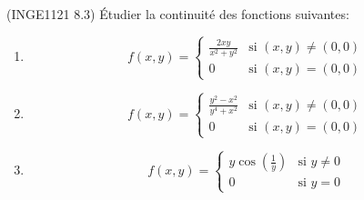 

\begin{exercice}\label{exoFoncDeuxVar0012}

	(INGE1121 8.3) Étudier la continuité des fonctions suivantes:
	\begin{enumerate}

		\item
			\begin{equation}
				f(x,y)=\begin{cases}
					\frac{ 2xy }{ x^2+y^2 }	&	\text{si $(x,y)\neq(0,0)$}\\
					0	&	 \text{si $(x,y)=(0,0)$}
				\end{cases}
			\end{equation}
		\item
			\begin{equation}
				f(x,y)=\begin{cases}
					\frac{ y^2-x^2 }{ y^4+x^2 }	&	\text{si $(x,y)\neq(0,0)$}\\
					0	&	 \text{si $(x,y)=(0,0)$}
				\end{cases}
			\end{equation}
			
		\item
			\begin{equation}
				f(x,y)=\begin{cases}
					y\cos(\frac{1}{ y })	&	\text{si $y\neq 0$}\\
					0	&	 \text{si $y=0$}
				\end{cases}
			\end{equation}
	\end{enumerate}

\end{exercice}
